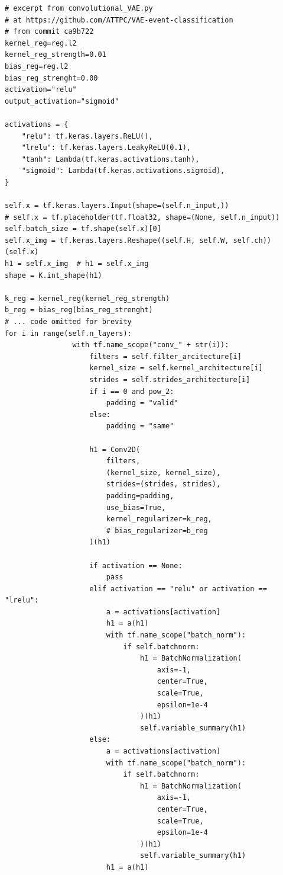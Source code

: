 \begin{lstlisting}[language=iPython]
# excerpt from convolutional_VAE.py
# at https://github.com/ATTPC/VAE-event-classification
# from commit ca9b722
kernel_reg=reg.l2
kernel_reg_strength=0.01
bias_reg=reg.l2
bias_reg_strenght=0.00
activation="relu"
output_activation="sigmoid"

activations = {
    "relu": tf.keras.layers.ReLU(),
    "lrelu": tf.keras.layers.LeakyReLU(0.1),
    "tanh": Lambda(tf.keras.activations.tanh),
    "sigmoid": Lambda(tf.keras.activations.sigmoid),
}

self.x = tf.keras.layers.Input(shape=(self.n_input,))
# self.x = tf.placeholder(tf.float32, shape=(None, self.n_input))
self.batch_size = tf.shape(self.x)[0]
self.x_img = tf.keras.layers.Reshape((self.H, self.W, self.ch))(self.x)
h1 = self.x_img  # h1 = self.x_img
shape = K.int_shape(h1)

k_reg = kernel_reg(kernel_reg_strength)
b_reg = bias_reg(bias_reg_strenght)
# ... code omitted for brevity
for i in range(self.n_layers):
                with tf.name_scope("conv_" + str(i)):
                    filters = self.filter_arcitecture[i]
                    kernel_size = self.kernel_architecture[i]
                    strides = self.strides_architecture[i]
                    if i == 0 and pow_2:
                        padding = "valid"
                    else:
                        padding = "same"

                    h1 = Conv2D(
                        filters,
                        (kernel_size, kernel_size),
                        strides=(strides, strides),
                        padding=padding,
                        use_bias=True,
                        kernel_regularizer=k_reg,
                        # bias_regularizer=b_reg
                    )(h1)

                    if activation == None:
                        pass
                    elif activation == "relu" or activation == "lrelu":
                        a = activations[activation]
                        h1 = a(h1)
                        with tf.name_scope("batch_norm"):
                            if self.batchnorm:
                                h1 = BatchNormalization(
                                    axis=-1,
                                    center=True,
                                    scale=True,
                                    epsilon=1e-4
                                )(h1)
                                self.variable_summary(h1)
                    else:
                        a = activations[activation]
                        with tf.name_scope("batch_norm"):
                            if self.batchnorm:
                                h1 = BatchNormalization(
                                    axis=-1,
                                    center=True,
                                    scale=True,
                                    epsilon=1e-4
                                )(h1)
                                self.variable_summary(h1)
                        h1 = a(h1)


\end{lstlisting}
